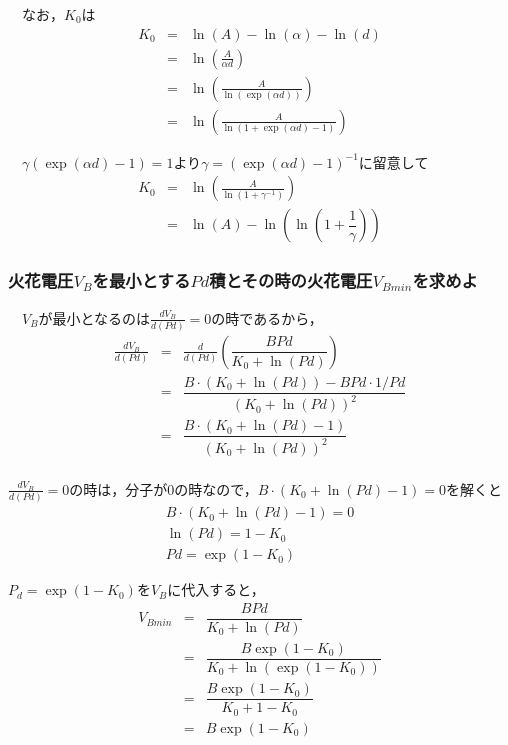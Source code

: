 　なお，$K_0$は
\begin{eqnarray}
    K_0 &=& \ln(A) - \ln(\alpha)  - \ln(d) \nonumber\\
        &=& \ln \left(\frac{A}{\alpha d}\right) \nonumber\\
        &=& \ln \left(\frac{A}{\ln \left( \exp \left(\alpha d\right)\right)}\right) \nonumber\\
        &=& \ln \left(\frac{A}{\ln \left(1 + \exp \left(\alpha d\right) - 1\right)}\right) \nonumber
\end{eqnarray}

　$\gamma\left( \exp\left(\alpha d\right) -1 \right) = 1$より$\gamma = \left( \exp\left(\alpha d\right) -1 \right)^{-1}$に留意して
\begin{eqnarray}
    K_0 &=& \ln \left(\frac{A}{\ln \left(1 + \gamma^{-1} \right)}\right) \nonumber\\
        &=& \ln \left(A\right) - \ln \left(\ln \left(1 + \dfrac{1}{\gamma} \right)\right) \nonumber
\end{eqnarray}

\subsubsection{火花電圧$V_B$を最小とする$Pd$積とその時の火花電圧$V_{Bmin}$を求めよ}
　$V_B$が最小となるのは$\frac{dV_B}{d(Pd)} = 0$の時であるから，
\begin{eqnarray}
    \frac{dV_B}{d(Pd)} &=& \frac{d}{d(Pd)} \left(\dfrac{BPd}{K_0 + \ln(Pd)}\right) \nonumber\\
    &=& \dfrac{B \cdot (K_0 + \ln(Pd)) - BPd \cdot 1/Pd}{(K_0 + \ln(Pd))^2} \nonumber\\
    &=& \dfrac{B \cdot (K_0 + \ln(Pd) - 1)}{(K_0 + \ln(Pd))^2} \nonumber\\
\end{eqnarray}

$\frac{dV_B}{d(Pd)} = 0$の時は，分子が0の時なので，$B \cdot (K_0 + \ln(Pd) - 1) = 0$を解くと
\begin{eqnarray}
    B \cdot (K_0 + \ln(Pd) - 1) = 0 \nonumber \\
    \ln(Pd) = 1 - K_0 \nonumber \\
    Pd = \exp(1 - K_0) \nonumber
\end{eqnarray}

$P_d = \exp(1 - K_0)$を$V_B$に代入すると，
\begin{eqnarray}
    V_{Bmin} &=& \dfrac{BPd}{K_0 + \ln(Pd)} \nonumber \\
                    &=& \dfrac{B \exp(1 - K_0)}{K_0 + \ln (\exp(1 - K_0))} \nonumber \\
                    &=& \dfrac{B \exp(1 - K_0)}{K_0 + 1 - K_0} \nonumber \\
                    &=& B \exp(1 - K_0) \nonumber
\end{eqnarray}

